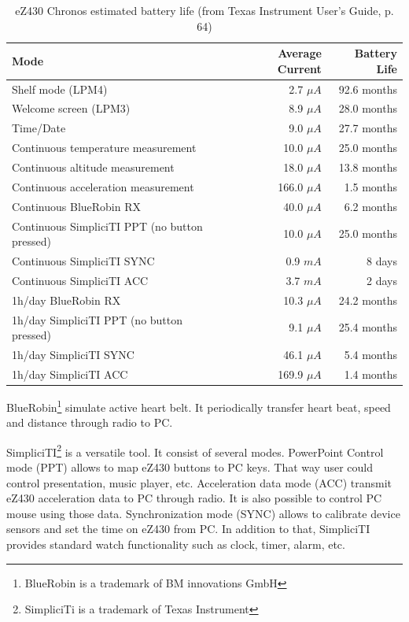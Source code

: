 \begin{table}
  \centering
    \begin{tabular}{|l|r|r|}
        \hline
        \textbf{Mode} & \textbf{Average Current} & \textbf{Battery Life} \\ \hline
        Shelf mode (LPM4) & 2.7 $\mu A$ & 92.6 months \\ \hline
        Welcome screen (LPM3) & 8.9 $\mu A$ & 28.0 months \\ \hline
        Time/Date & 9.0 $\mu A$ & 27.7 months \\ \hline
        Continuous temperature measurement & 10.0 $\mu A$ & 25.0 months \\ \hline
        Continuous altitude measurement & 18.0 $\mu A$ & 13.8 months \\ \hline
        Continuous acceleration measurement & 166.0 $\mu A$ & 1.5 months \\ \hline
        Continuous BlueRobin RX & 40.0 $\mu A$ & 6.2 months \\ \hline
        Continuous SimpliciTI PPT (no button pressed) & 10.0 $\mu A$ & 25.0 months \\ \hline
        Continuous SimpliciTI SYNC & 0.9 $m A$ & 8 days \\ \hline
        Continuous SimpliciTI ACC & 3.7 $m A$ & 2 days \\ \hline
        1h/day BlueRobin RX & 10.3 $\mu A$ & 24.2 months \\ \hline
        1h/day SimpliciTI PPT (no button pressed) & 9.1 $\mu A$ & 25.4 months \\ \hline
        1h/day SimpliciTI SYNC & 46.1 $\mu A$ & 5.4 months \\ \hline
        1h/day SimpliciTI ACC & 169.9 $\mu A$ & 1.4 months \\ \hline
    \end{tabular}
  \caption{eZ430 Chronos estimated battery life (from Texas Instrument User's Guide, p. 64)}
  \label{tab:power-specification}
\end{table}

BlueRobin\footnote{BlueRobin is a trademark of BM innovations GmbH} simulate active heart belt.
It periodically transfer heart beat, speed and distance through radio to PC.

SimpliciTI\footnote{SimpliciTi is a trademark of Texas Instrument} is a versatile tool.
It consist of several modes.
PowerPoint Control mode (PPT) allows to map eZ430 buttons to PC keys.
That way user could control presentation, music player, etc.
Acceleration data mode (ACC) transmit eZ430 acceleration data to PC through radio.
It is also possible to control PC mouse using those data.
Synchronization mode (SYNC) allows to calibrate device sensors and set the time on eZ430 from PC.
In addition to that, SimpliciTI provides standard watch functionality such as clock, timer, alarm, etc. 

